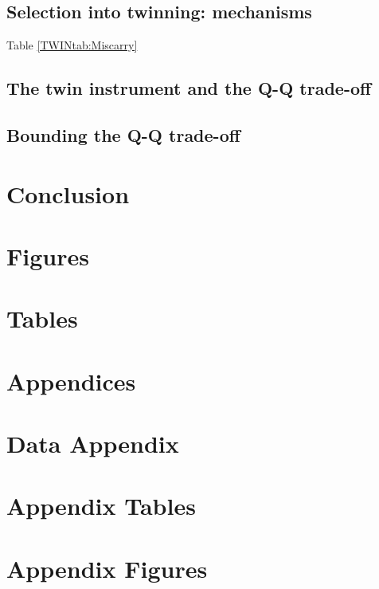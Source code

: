 \documentclass{article}[11pt,subeqn]
\begin{document}
\begin{spacing}{1.4}
\subsection{Selection into twinning: mechanisms}   \label{TWINsscn:selection}
Table \ref{TWINtab:Miscarry}

\subsection{The twin instrument and the Q-Q trade-off} \label{TWINsscn:QQtwins}
\subsection{Bounding the Q-Q trade-off}            \label{TWINsscn:resultBounds}



\section{Conclusion}                               \label{TWINscn:conclusion}

\newpage
\section*{Figures}


\clearpage
\section*{Tables}

\clearpage




\newpage
\appendix
\section*{Appendices}
\section{Data Appendix}
\newpage
\end{spacing}

\section{Appendix Tables}

\newpage

\section{Appendix Figures}

\end{document}
